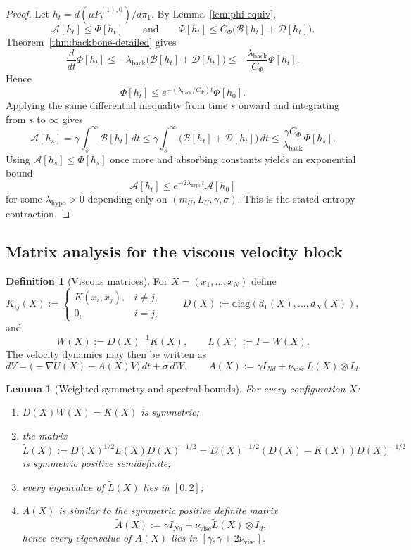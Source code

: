 \documentclass[11pt]{article}
\newtheorem{lemma}[theorem]{Lemma}
\theoremstyle{definition}
\newtheorem{definition}[theorem]{Definition}
\theoremstyle{remark}
\begin{document}
\begin{proof}
Let $h_t=d(\mu P_t^{(1),0})/d\pi_1$. By Lemma~\ref{lem:phi-equiv},
\[
\mathcal A[h_t]\le \Phi[h_t]
\qquad\text{and}\qquad
\Phi[h_t]\le C_\Phi\bigl(\mathcal B[h_t]+\mathcal D[h_t]\bigr).
\]
Theorem~\ref{thm:backbone-detailed} gives
\[
\frac{d}{dt}\Phi[h_t]
\leq
-\lambda_{\mathrm{back}}\bigl(\mathcal B[h_t]+\mathcal D[h_t]\bigr)
\leq
-\frac{\lambda_{\mathrm{back}}}{C_\Phi}\Phi[h_t].
\]
Hence
\[
\Phi[h_t]\leq e^{-(\lambda_{\mathrm{back}}/C_\Phi)t}\Phi[h_0].
\]
Applying the same differential inequality from time \(s\) onward and
integrating from \(s\) to \(\infty\) gives
\[
\mathcal A[h_s]
=
\gamma\int_s^\infty \mathcal B[h_t]\,dt
\leq
\gamma \int_s^\infty \bigl(\mathcal B[h_t]+\mathcal D[h_t]\bigr)\,dt
\leq
\frac{\gamma C_\Phi}{\lambda_{\mathrm{back}}}\Phi[h_s].
\]
Using $\mathcal A[h_s]\leq \Phi[h_s]$ once more and absorbing constants yields
an exponential bound
\[
\mathcal A[h_t]\leq e^{-2\lambda_{\mathrm{hypo}}t}\mathcal A[h_0]
\]
for some $\lambda_{\mathrm{hypo}}>0$ depending only on
$(m_U,L_U,\gamma,\sigma)$. This is the stated entropy contraction.
\end{proof}

\subsection{Matrix analysis for the viscous velocity block}

\begin{definition}[Viscous matrices]\label{def:matrices}
For $X=(x_1,\dots,x_N)$ define
\[
K_{ij}(X):=
\begin{cases}
K(x_i,x_j), & i\neq j,\\
0, & i=j,
\end{cases}
\qquad
D(X):=\mathrm{diag}(d_1(X),\dots,d_N(X)),
\]
and
\[
W(X):=D(X)^{-1}K(X),
\qquad
L(X):=I-W(X).
\]
The velocity dynamics may then be written as
\[
dV
=
\bigl(-\nabla U(X)-A(X)V\bigr)\,dt+\sigma\,dW,
\qquad
A(X):=\gamma I_{Nd}+\nu_{\mathrm{visc}}\,L(X)\otimes I_d.
\]
\end{definition}

\begin{lemma}[Weighted symmetry and spectral bounds]\label{lem:weighted-sym}
For every configuration $X$:
\begin{enumerate}[label=\textnormal{(\roman*)},leftmargin=1.5em]
\item $D(X)W(X)=K(X)$ is symmetric;
\item the matrix
\[
\widetilde L(X):=D(X)^{1/2}L(X)D(X)^{-1/2}
=
D(X)^{-1/2}(D(X)-K(X))D(X)^{-1/2}
\]
is symmetric positive semidefinite;
\item every eigenvalue of $\widetilde L(X)$ lies in $[0,2]$;
\item $A(X)$ is similar to the symmetric positive definite matrix
\[
\widetilde A(X)
:=
\gamma I_{Nd}+\nu_{\mathrm{visc}}\widetilde L(X)\otimes I_d,
\]
hence every eigenvalue of $A(X)$ lies in $[\gamma,\gamma+2\nu_{\mathrm{visc}}]$.
\end{enumerate}
\end{lemma}
\end{document}

